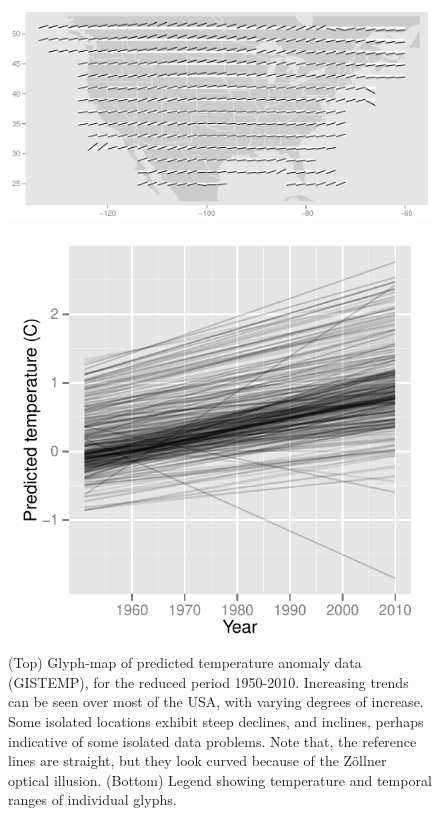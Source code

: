 \documentclass[oneside]{article}
\begin{document}
\begin{figure}[htbp]
  \centering
  \includegraphics[width=1\linewidth]{gistemp-pred}

  \includegraphics[width=0.33\linewidth]{gistemp-pred-legend}

  \caption{(Top) Glyph-map of predicted temperature anomaly data
    (GISTEMP), for the reduced period 1950-2010. Increasing
    trends can be seen over most of the USA, with varying degrees of
    increase. Some isolated locations exhibit steep declines, and
    inclines, perhaps indicative of some isolated data problems. Note
    that, the reference lines are straight, but they look curved
    because of the Z\"ollner optical illusion. (Bottom) Legend showing
    temperature and temporal ranges of individual glyphs.}
  \label{fig:gistemp-pred}
\end{figure}

\end{document}
